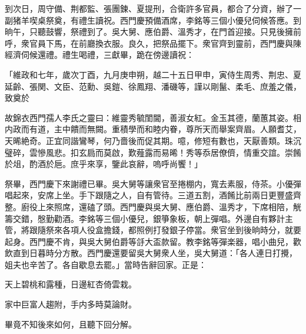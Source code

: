 到次日，周守備、荆都監、張團鍊、夏提刑，合衛許多官員，都合了分資，辦了一副猪羊喫桌祭奠，有禮生讀祝。西門慶預備酒席，李銘等三個小優兒伺候答應。到晌午，只聽鼓響，祭禮到了。吳大舅、應伯爵、溫秀才，在門首迎接。只見後擁前呼，衆官員下馬，在前廳換衣服。良久，把祭品擺下。衆官齊到靈前，西門慶與陳經濟伺候還禮。禮生喝禮，三獻畢，跪在傍邊讀祝：

\begin{myquote}
「維政和七年，歲次丁酉，九月庚申朔，越二十五日甲申，寅侍生周秀、荆忠、夏延齡、張関、文臣、范勳、吳鎧、徐鳳翔、潘磯等，謹以剛鬣、柔毛、庶羞之儀，致奠於

故錦衣西門孺人李氏之靈曰：維靈秀毓閨閫，善淑女紅。金玉其德，蘭蕙其姿。相内政而有道，主中饋而無闕。重積學而和睦内眷，尊所天而舉案齊眉。人願耆艾，天晞絶奇。正宜同諧鸞琴，何乃嗇後而促其期。噫，修短有數也，天厭善類。珠沉璧碎，雲慘風悲。扣玄扃而莫啟，歎薤露而易晞！秀等忝居僚儕，情重交誼。崇餚於俎，酌酒於巵。庶乎來享，鑒此哀辭，嗚呼尚饗！」
\end{myquote}

祭畢，西門慶下來謝禮已畢。吳大舅等讓衆官至捲棚内，寬去素服，侍茶。小優彈唱起來，安席上坐。手下跟隨之人，自有管待。三道五割，酒餚比前兩日更豐盛齊整。廚役上來照席，還磕了頭。西門慶與吳大舅、應伯爵、溫秀才，下席相陪，觥籌交錯，慇勤勸酒。李銘等三個小優兒，銀箏象板，朝上彈唱。外邊自有夥計主管，將跟隨祭來各項人役盒擔錢，都照例打發銀子停當。衆官坐到後晌時分，就要起身。西門慶不肯，與吳大舅伯爵等㧱大盃款留。教李銘等彈楽器，唱小曲兒，歡飲直到日暮時分方散。西門慶還要留吳大舅衆人坐，吳大舅道：「各人連日打攪，姐夫也辛苦了。各自歇息去罷。」當時告辭回家。正是：

\begin{myquote}
天上碧桃和露種，日邊紅杏倚雲栽。

家中巨富人趨附，手内多時莫論財。
\end{myquote}

畢竟不知後來如何，且聽下回分解。


